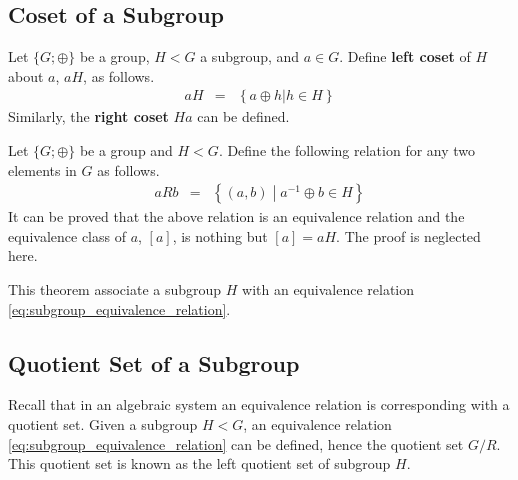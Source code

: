 \subsection{Coset of a Subgroup}

Let $\{G;\oplus\}$ be a group, $H < G$ a subgroup, and $a\in G$. Define \textbf{left coset} of $H$ about $a$, $aH$, as follows.
\begin{eqnarray}
  aH &=& \left\{a\oplus h| h \in H \right\} \nonumber
\end{eqnarray} 
Similarly, the \textbf{right coset} $Ha$ can be defined.

Let $\{G;\oplus\}$ be a group and $H<G$. Define the following relation for any two elements in $G$ as follows.
\begin{eqnarray}
  aRb &=& \left\{(a,b) \middle| a^{-1}\oplus b\in H \right\}  \label{eq:subgroup_equivalence_relation}
\end{eqnarray}
It can be proved that the above relation is an equivalence relation and the equivalence class of $a$, $[a]$, is nothing but $[a] = aH$. The proof is neglected here.

This theorem associate a subgroup $H$ with an equivalence relation \eqref{eq:subgroup_equivalence_relation}.

\subsection{Quotient Set of a Subgroup}

Recall that in an algebraic system an equivalence relation is corresponding with a quotient set. Given a subgroup $H<G$, an equivalence relation \eqref{eq:subgroup_equivalence_relation} can be defined, hence the quotient set $G/R$. This quotient set is known as the left quotient set of subgroup $H$.








































